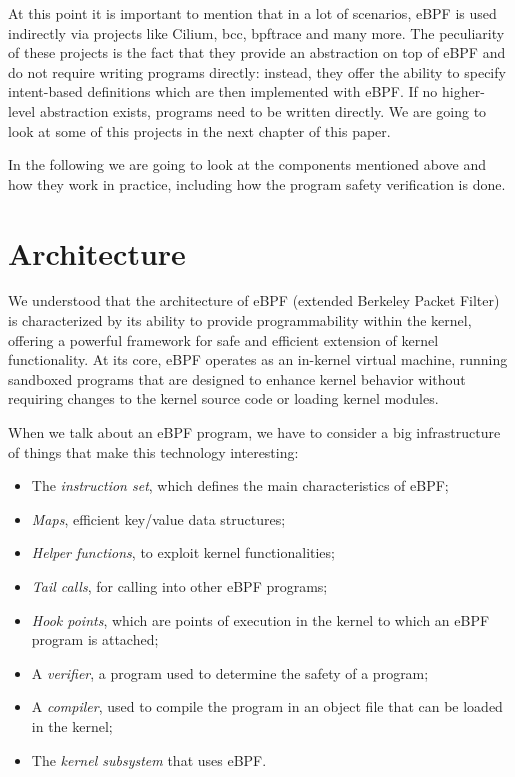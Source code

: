 At this point it is important to mention that in a lot of scenarios, eBPF is used indirectly via projects like Cilium, bcc, bpftrace and many more. 
The peculiarity of these projects is the fact that they provide an abstraction on top of eBPF and do not require writing programs directly: instead, they offer the ability to specify intent-based definitions which are then implemented with eBPF.
If no higher-level abstraction exists, programs need to be written directly. 
We are going to look at some of this projects in the next chapter of this paper.

In the following we are going to look at the  components mentioned above and how they work in practice, including how the program safety verification is done.

\section{Architecture}

We understood that the architecture of eBPF (extended Berkeley Packet Filter) is characterized by its ability to provide programmability within the kernel, offering a powerful framework for safe and efficient extension of kernel functionality. 
At its core, eBPF operates as an in-kernel virtual machine, running sandboxed programs that are designed to enhance kernel behavior without requiring changes to the kernel source code or loading kernel modules.

When we talk about an eBPF program, we have to consider a big infrastructure of things that make this technology interesting:

\begin{itemize}
	\item 
		The \textit{instruction set}, which defines the main characteristics of eBPF;
	\item 
		\textit{Maps}, efficient key/value data structures;
	\item 
		\textit{Helper functions}, to exploit kernel functionalities;
	\item 
		\textit{Tail calls}, for calling into other eBPF programs;
	\item 
		\textit{Hook points}, which are points of execution in the kernel to which an eBPF program	is attached;
	\item 
		A \textit{verifier}, a program used to determine the safety of a program;
	\item 
		A \textit{compiler}, used to compile the program in an object file that can be loaded in the kernel; 
	\item 
		The \textit{kernel subsystem} that uses eBPF.
\end{itemize}

